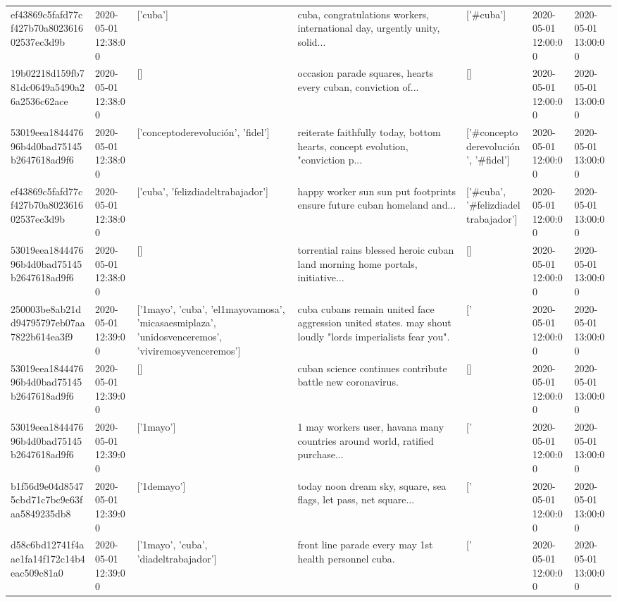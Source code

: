 \begin{tabular}{lllllll}
ef43869c5fafd77cf427b70a802361602537ec3d9b & 2020-05-01 12:38:00 & ['cuba'] & cuba, congratulations workers, international day, urgently unity, solid... & ['#cuba'] & 2020-05-01 12:00:00 & 2020-05-01 13:00:00 \\
19b02218d159fb781dc0649a5490a26a2536c62ace & 2020-05-01 12:38:00 & [] & occasion parade squares, hearts every cuban, conviction of... & [] & 2020-05-01 12:00:00 & 2020-05-01 13:00:00 \\
53019eea184447696b4d0bad75145b2647618ad9f6 & 2020-05-01 12:38:00 & ['conceptoderevolución', 'fidel'] & reiterate faithfully today, bottom hearts, concept evolution, "conviction p... & ['#conceptoderevolución', '#fidel'] & 2020-05-01 12:00:00 & 2020-05-01 13:00:00 \\
ef43869c5fafd77cf427b70a802361602537ec3d9b & 2020-05-01 12:38:00 & ['cuba', 'felizdiadeltrabajador'] & happy worker sun sun put footprints ensure future cuban homeland and... & ['#cuba', '#felizdiadeltrabajador'] & 2020-05-01 12:00:00 & 2020-05-01 13:00:00 \\
53019eea184447696b4d0bad75145b2647618ad9f6 & 2020-05-01 12:38:00 & [] & torrential rains blessed heroic cuban land morning home portals, initiative... & [] & 2020-05-01 12:00:00 & 2020-05-01 13:00:00 \\
250003be8ab21dd94795797eb07aa7822b614ea3f9 & 2020-05-01 12:39:00 & ['1mayo', 'cuba', 'el1mayovamosa', 'micasaesmiplaza', 'unidosvenceremos', 'viviremosyvenceremos'] & cuba cubans remain united face aggression united states. may shout loudly "lords imperialists fear you". & ['#1mayo', '#cuba', '#el1mayovamosa', '#micasaesmiplaza', '#unidosvenceremos', '#viviremosyvenceremos'] & 2020-05-01 12:00:00 & 2020-05-01 13:00:00 \\
53019eea184447696b4d0bad75145b2647618ad9f6 & 2020-05-01 12:39:00 & [] & cuban science continues contribute battle new coronavirus. & [] & 2020-05-01 12:00:00 & 2020-05-01 13:00:00 \\
53019eea184447696b4d0bad75145b2647618ad9f6 & 2020-05-01 12:39:00 & ['1mayo'] & 1 may workers user, havana many countries around world, ratified purchase... & ['#1mayo'] & 2020-05-01 12:00:00 & 2020-05-01 13:00:00 \\
b1f56d9e04d85475cbd71c7bc9e63faa5849235db8 & 2020-05-01 12:39:00 & ['1demayo'] & today noon dream sky, square, sea flags, let pass, net square... & ['#1demayo'] & 2020-05-01 12:00:00 & 2020-05-01 13:00:00 \\
d58c6bd12741f4aae1fa14f172c14b4eac509c81a0 & 2020-05-01 12:39:00 & ['1mayo', 'cuba', 'diadeltrabajador'] & front line parade every may 1st health personnel cuba. & ['#1mayo', '#cuba', '#diadeltrabajador'] & 2020-05-01 12:00:00 & 2020-05-01 13:00:00 \\

\end{tabular}
